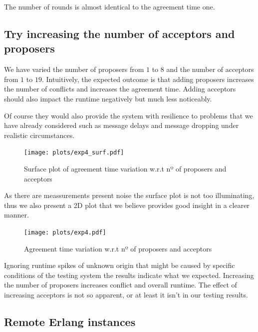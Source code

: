 \documentclass[a4paper, 10pt]{article}
\begin{document}
The number of rounds is almost identical to the agreement time one.


\clearpage
\subsection{Try increasing the number of acceptors and proposers}

We have varied the number of proposers from $1$ to $8$ and the number of acceptors
from $1$ to $19$. Intuitively, the expected outcome is that adding proposers increases the number of conflicts and increases the agreement time. Adding acceptors should also impact the runtime negatively but much less noticeably. 

Of course they would also provide the system with resilience to problems that we have already considered such as message delays and message dropping under realistic circumstances. 

\begin{figure}[H]
  \centering
  \texttt{[image: plots/exp4\_surf.pdf]}
    \caption{Surface plot of agreement time variation w.r.t nº of proposers and acceptors}
\end{figure} 

As there are meassurements present noise the surface plot is not too illuminating, thus we also present a 2D plot that we believe provides good insight in a clearer manner.

\clearpage
\begin{figure}[H]
  \centering
  \texttt{[image: plots/exp4.pdf]}
    \caption{Agreement time variation w.r.t nº of proposers and acceptors}
\end{figure} 


Ignoring runtime spikes of unknown origin that might be caused by specific conditions of the testing system the results indicate what we expected. Increasing the number of proposers increases conflict and overall runtime. The effect of increasing acceptors is not so apparent, or at least it isn't in our testing results.


\clearpage

\subsection{Remote Erlang instances}
\end{document}
